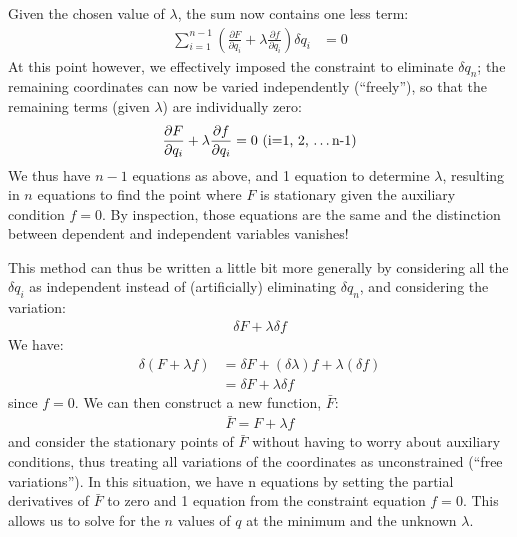 Given the chosen value of $\lambda$, the sum now contains one less term:
\begin{align}
\sum_{i=1}^{n-1} \left(\frac{\partial F}{\partial q_i}+ \lambda \frac{\partial f}{\partial q_i}\right)\delta q_i&=0
\end{align}
At this point however, we effectively imposed the constraint to eliminate $\delta q_n$; the remaining coordinates can now be varied independently (``freely''), so that the remaining terms (given $\lambda$) are individually zero:
\begin{align}
\frac{\partial F}{\partial q_i}+ \lambda \frac{\partial f}{\partial q_i}=0 \text{       (i=1, 2, \dots n-1)}
\end{align}
We thus have $n-1$ equations as above, and 1 equation to determine $\lambda$, resulting in $n$ equations to find the point where $F$ is stationary given the auxiliary condition $f=0$. By inspection, those equations are the same and the distinction between dependent and independent variables vanishes!

This method can thus be written a little bit more generally by considering all the $\delta q_i$ as independent instead of (artificially) eliminating $\delta q_n$, and considering the variation:
\begin{align}
\delta F + \lambda \delta f
\end{align}
We have:
\begin{align}
\delta (F+\lambda f) &= \delta F+ (\delta \lambda) f + \lambda (\delta f\nonumber)\\
&=\delta F + \lambda \delta f
\end{align}
since $f=0$. We can then construct a new function, $\bar{F}$:
\begin{align}
\bar{F}=F + \lambda f
\end{align}
and consider the stationary points of $\bar{F}$ without having to worry about auxiliary conditions, thus treating all variations of the coordinates as unconstrained (``free variations''). In this situation, we have n equations by setting the partial derivatives of $\bar{F}$ to zero and 1 equation from the constraint equation $f=0$. This allows us to solve for the $n$ values of $q$ at the minimum and the unknown $\lambda$.


